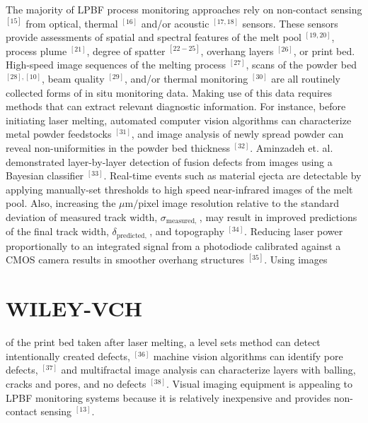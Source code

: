 \documentclass[10pt]{article}
\begin{document}
The majority of LPBF process monitoring approaches rely on non-contact sensing ${ }^{[15]}$ from optical, thermal ${ }^{[16]}$ and/or acoustic ${ }^{[17,18]}$ sensors. These sensors provide assessments of spatial and spectral features of the melt pool ${ }^{[19,20]}$, process plume ${ }^{[21]}$, degree of spatter ${ }^{[22-25]}$, overhang layers ${ }^{[26]}$, or print bed. High-speed image sequences of the melting process ${ }^{[27]}$, scans of the powder bed ${ }^{[28],[10]}$, beam quality ${ }^{[29]}$, and/or thermal monitoring ${ }^{[30]}$ are all routinely collected forms of in situ monitoring data. Making use of this data requires methods that can extract relevant diagnostic information. For instance, before initiating laser melting, automated computer vision algorithms can characterize metal powder feedstocks ${ }^{[31]}$, and image analysis of newly spread powder can reveal non-uniformities in the powder bed thickness ${ }^{[32]}$. Aminzadeh et. al. demonstrated layer-by-layer detection of fusion defects from images using a Bayesian classifier ${ }^{[33]}$. Real-time events such as material ejecta are detectable by applying manually-set thresholds to high speed near-infrared images of the melt pool. Also, increasing the $\mu \mathrm{m} / \mathrm{pixel}$ image resolution relative to the standard deviation of measured track width, $\sigma_{\text {measured, }}$, may result in improved predictions of the final track width, $\delta_{\text {predicted, }}$, and topography ${ }^{[34]}$. Reducing laser power proportionally to an integrated signal from a photodiode calibrated against a CMOS camera results in smoother overhang structures ${ }^{[35]}$. Using images

\section*{WILEY-VCH}
of the print bed taken after laser melting, a level sets method can detect intentionally created defects, ${ }^{[36]}$ machine vision algorithms can identify pore defects, ${ }^{[37]}$ and multifractal image analysis can characterize layers with balling, cracks and pores, and no defects ${ }^{[38]}$. Visual imaging equipment is appealing to LPBF monitoring systems because it is relatively inexpensive and provides non-contact sensing ${ }^{[13]}$.
\end{document}
